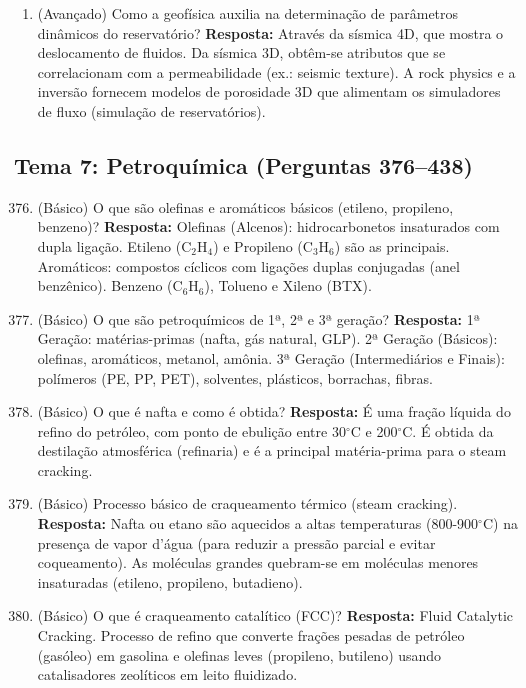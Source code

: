 \documentclass[11pt,a4paper]{article}
\begin{document}
\begin{enumerate}
  \item (Avançado) Como a geofísica auxilia na determinação de parâmetros dinâmicos do reservatório?
  \textbf{Resposta:} Através da sísmica 4D, que mostra o deslocamento de fluidos. Da sísmica 3D, obtêm-se atributos que se correlacionam com a permeabilidade (ex.: seismic texture). A rock physics e a inversão fornecem modelos de porosidade 3D que alimentam os simuladores de fluxo (simulação de reservatórios).
\end{enumerate}

\newpage

\subsection*{Tema 7: Petroquímica (Perguntas 376–438)}

\begin{enumerate}
  \setcounter{enumi}{375}
  \item (Básico) O que são olefinas e aromáticos básicos (etileno, propileno, benzeno)?
  \textbf{Resposta:} Olefinas (Alcenos): hidrocarbonetos insaturados com dupla ligação. Etileno (C$_2$H$_4$) e Propileno (C$_3$H$_6$) são as principais. Aromáticos: compostos cíclicos com ligações duplas conjugadas (anel benzênico). Benzeno (C$_6$H$_6$), Tolueno e Xileno (BTX).

  \item (Básico) O que são petroquímicos de 1ª, 2ª e 3ª geração?
  \textbf{Resposta:} 1ª Geração: matérias-primas (nafta, gás natural, GLP). 2ª Geração (Básicos): olefinas, aromáticos, metanol, amônia. 3ª Geração (Intermediários e Finais): polímeros (PE, PP, PET), solventes, plásticos, borrachas, fibras.

  \item (Básico) O que é nafta e como é obtida?
  \textbf{Resposta:} É uma fração líquida do refino do petróleo, com ponto de ebulição entre 30$^\circ$C e 200$^\circ$C. É obtida da destilação atmosférica (refinaria) e é a principal matéria-prima para o steam cracking.

  \item (Básico) Processo básico de craqueamento térmico (steam cracking).
  \textbf{Resposta:} Nafta ou etano são aquecidos a altas temperaturas (800-900$^\circ$C) na presença de vapor d'água (para reduzir a pressão parcial e evitar coqueamento). As moléculas grandes quebram-se em moléculas menores insaturadas (etileno, propileno, butadieno).

  \item (Básico) O que é craqueamento catalítico (FCC)?
  \textbf{Resposta:} Fluid Catalytic Cracking. Processo de refino que converte frações pesadas de petróleo (gasóleo) em gasolina e olefinas leves (propileno, butileno) usando catalisadores zeolíticos em leito fluidizado.


\end{enumerate}
\end{document}
